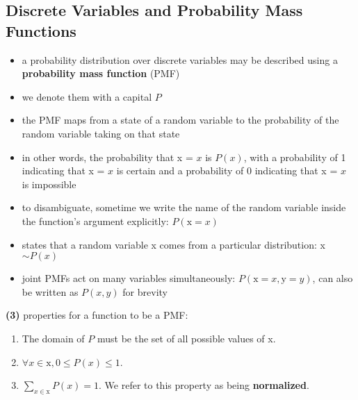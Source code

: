 \documentclass[11pt, twocolumn]{report}
\begin{document}
\subsection{Discrete Variables and Probability Mass Functions}
\begin{itemize}
  \item a probability distribution over discrete variables may be described
    using a \textbf{probability mass function} (PMF)
  \item we denote them with a capital $P$
  \item the PMF maps from a state of a random variable to the probability of
    the random variable taking on that state
  \item in other words, the probability that x = $x$ is $P(x)$, with a
    probability of 1 indicating that x = $x$ is certain and a probability of 0
    indicating that x = $x$ is impossible
  \item to disambiguate, sometime we write the name of the random variable
    inside the function's argument explicitly: $P(\text{x} = x)$
  \item states that a random variable x comes from a particular distribution: x
    $ \sim P(x)$
  \item joint PMFs act on many variables simultaneously: $P(\text{x} = x,
    \text{y} = y)$, can also be written as $P(x, y)$ for brevity
\end{itemize}
\textbf{(3)} properties for a function to be a PMF:
\begin{enumerate}
  \item The domain of $P$ must be the set of all possible values of x.
  \item $\forall x \in \text{x}, 0 \leq P(x) \leq 1$. 
  \item $\sum_{x \in \text{x}} P(x) = 1$. We refer to this property as being
    \textbf{normalized}.
\end{enumerate}
\end{document}
